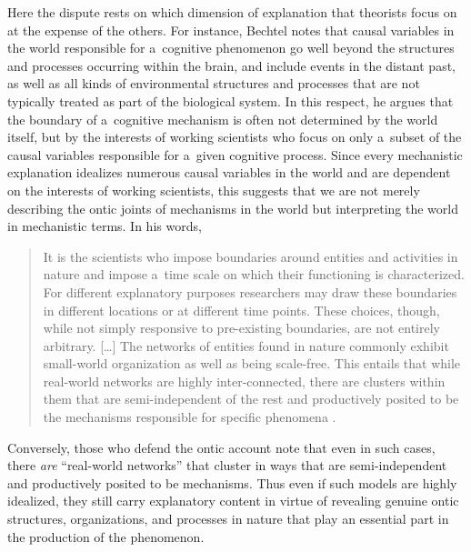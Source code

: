 Here the dispute rests on which dimension of explanation that theorists focus on at the expense of the others. For instance, Bechtel
\parencite*[][]{bechtel_can_2015} %
 notes that causal variables in the world responsible for a~cognitive phenomenon go well beyond the structures and processes occurring within the brain, and include events in the distant past, as well as all kinds of environmental structures and processes that are not typically treated as part of the biological system. In this respect, he argues that the boundary of a~cognitive mechanism is often not determined by the world itself, but by the interests of working scientists who focus on only a~subset of the causal variables responsible for a~given cognitive process. Since every mechanistic explanation idealizes numerous causal variables in the world and are dependent on the interests of working scientists, this suggests that we are not merely describing the ontic joints of mechanisms in the world but interpreting the world in mechanistic terms. In his words,

\begin{quotation}
It is the scientists who impose boundaries around entities and activities in nature and impose a~time scale on which their functioning is characterized. For different explanatory purposes researchers may draw these boundaries in different locations or at different time points. These choices, though, while not simply responsive to pre-existing boundaries, are not entirely arbitrary. […] The networks of entities found in nature commonly exhibit small-world organization as well as being scale-free. This entails that while real-world networks are highly inter-connected, there are clusters within them that are semi-independent of the rest and productively posited to be the mechanisms responsible for specific phenomena
\parencite[][p.85]{bechtel_can_2015}.%


\end{quotation}
Conversely, those who defend the ontic account note that even in such cases, there \textit{are} ``real-world networks'' that cluster in ways that are semi-independent and productively posited to be mechanisms. Thus even if such models are highly idealized, they still carry explanatory content in virtue of revealing genuine ontic structures, organizations, and processes in nature that play an essential part in the production of the phenomenon.

